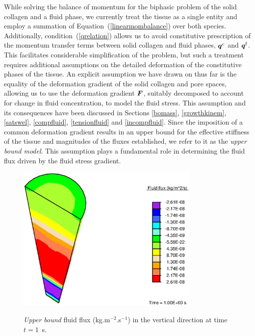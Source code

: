 While solving the balance of momentum for the biphasic problem
of the solid collagen and a fluid phase, we currently treat the
tissue as a single entity and employ a summation of
Equation~(\ref{linearmombalance}) over both species. Additionally,
condition~(\ref{qrelation}) allows us to avoid constitutive
prescription of the momentum transfer terms between solid collagen and
fluid phases,
$\mbox{\boldmath$ q$}^\mathrm{c}$ and $\mbox{\boldmath$ q$}^\mathrm{f}$. This facilitates considerable
simplification of the 
problem, but such a treatment requires additional assumptions on the
detailed deformation of the constitutive phases of the tissue. An
explicit assumption we have drawn on thus far is the equality of
the deformation gradient of the solid collagen and pore spaces,
allowing us to use the deformation gradient
$\mbox{\boldmath$ F$}$, suitably decomposed to account for change in fluid
concentration, to model the fluid stress. This assumption and its 
consequences have been discussed in Sections \ref{bomass},
\ref{growthkinem}, \ref{satswel}, \ref{compfluid}, \ref{tensionfluid}
and \ref{incompfluid}. Since the imposition of a common deformation gradient
results in an upper bound for the 
effective stiffness of the tissue and magnitudes of the fluxes
established, we refer to it as the {\em upper bound model}. This
assumption plays a fundamental role in determining the fluid flux driven
by the fluid stress gradient.

\begin{figure}[!hpt]
  \centering
      {\includegraphics[width=0.8\textwidth]{images/examples/lagrangian/constriction/upper-bound-flux}}
      \caption{{\em Upper bound} fluid flux (kg.m$^{-2}$.s$^{-1}$) in
        the vertical direction at time $t=1$~s.}
      \label{eg2flux}
\end{figure}


